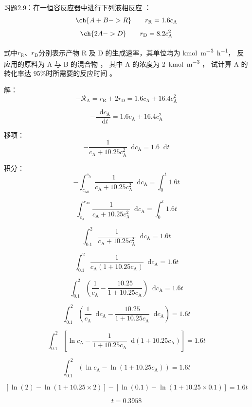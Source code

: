 \documentclass[cn,blue,14pt,normal]{elegantnote}
\newcommand*{\dif}{\mathop{}\!\mathrm{d}}
\begin{document}
习题2.9：在一恒容反应器中进行下列液相反应 ：
        \[
            \ch{A + B -> R} \qquad r_\mathrm{R} = 1.6 c_\mathrm{A}
        \]
        \[
            \ch{2 A -> D}  \qquad r_\mathrm{D} = 8.2 c_\mathrm{A}^2
        \]
        
        式中$r_\mathrm{R}$、$r_\mathrm{D}$分别表示产物 R 及 D 的生成速率，其单位均为 \si{kmol.m^{-3}.h^{-1}}， 反应用的原料为 A 与 B 的混合物 ， 其中 A 的浓度为 \SI{2}{kmol.m^{-3}} ， 试计算 A 的转化率达 95\%时所需要的反应时间 。

解：
\[
    - \mathcal{R}_\mathrm{A} = r_\mathrm{R} + 2 r_\mathrm{D} = 1.6 c_\mathrm{A} + 16.4 c_\mathrm{A}^2
\]

\[
    -\frac{\dif c_\mathrm{A}}{\dif t} = 1.6 c_\mathrm{A} + 16.4 c_\mathrm{A}^2
\]

移项：
\[
    -\frac{1}{c_\mathrm{A} + 10.25 c_\mathrm{A}^2}\dif c_\mathrm{A} = 1.6 \dif t
\]

积分：
\[
    -\int_{c_\mathrm{A0}}^{c_\mathrm{A}}\frac{1}{c_\mathrm{A} + 10.25 c_\mathrm{A}^2}\dif c_\mathrm{A} = \int_{0}^{t}1.6 t
\]

\[
    \int_{c_\mathrm{A}}^{c_\mathrm{A0}}\frac{1}{c_\mathrm{A} + 10.25 c_\mathrm{A}^2}\dif c_\mathrm{A} = \int_{0}^{t}1.6 t
\]

\[
    \int_{0.1}^{2}\frac{1}{c_\mathrm{A} + 10.25 c_\mathrm{A}^2}\dif c_\mathrm{A} = 1.6 t
\]

\[
    \int_{0.1}^{2}\frac{1}{c_\mathrm{A}(1 + 10.25 c_\mathrm{A})}\dif c_\mathrm{A} = 1.6 t
\]

\[
    \int_{0.1}^{2}\left(\frac{1}{c_\mathrm{A}} - \frac{10.25}{1 + 10.25 c_\mathrm{A}}\right)\dif c_\mathrm{A} = 1.6 t
\]

\[
    \int_{0.1}^{2}\left(\frac{1}{c_\mathrm{A}}\dif c_\mathrm{A} - \frac{10.25}{1 + 10.25 c_\mathrm{A}}\dif c_\mathrm{A}\right) = 1.6 t
\]

\[
    \int_{0.1}^{2}\left[\ln c_\mathrm{A} - \frac{1}{1 + 10.25 c_\mathrm{A}}\dif (1 + 10.25 c_\mathrm{A})\right] = 1.6 t
\]

\[
    \int_{0.1}^{2}\left(\ln c_\mathrm{A} - \ln (1 + 10.25 c_\mathrm{A})\right) = 1.6 t
\]

\[
    [\ln(2) - \ln(1+10.25\times 2)] - [\ln(0.1) - \ln(1+10.25\times 0.1)] = 1.6t
\]

\[
    t = 0.3958
\]
\end{document}
